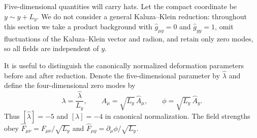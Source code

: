 \documentclass[a4paper,11pt]{article}
\numberwithin{equation}{section}
\begin{document}
Five-dimensional quantities will carry hats. Let the compact coordinate be $y\sim y+L_y$. We do not consider a general Kaluza--Klein reduction: throughout this section we take a product background with $\widehat g_{\mu y}=0$ and $\widehat g_{yy}=1$, omit fluctuations of the Kaluza--Klein vector and radion, and retain only zero modes, so all fields are independent of $y$.

It is useful to distinguish the canonically normalized deformation parameters before and after reduction. Denote the five-dimensional parameter by $\widehat\lambda$ and define the four-dimensional zero modes by
\begin{equation}
 \lambda=\frac{\widehat\lambda}{L_y},
 \qquad
 A_\mu=\sqrt{L_y}\,\widehat A_\mu,
 \qquad
 \phi=\sqrt{L_y}\,\widehat A_y.
 \label{eq:reduction-rescaling}
\end{equation}
Thus $[\widehat\lambda]=-5$ and $[\lambda]=-4$ in canonical normalization. The field strengths obey
$\widehat F_{\mu\nu}=F_{\mu\nu}/\sqrt{L_y}$ and
$\widehat F_{\mu y}=\partial_\mu\phi/\sqrt{L_y}$.
\end{document}
